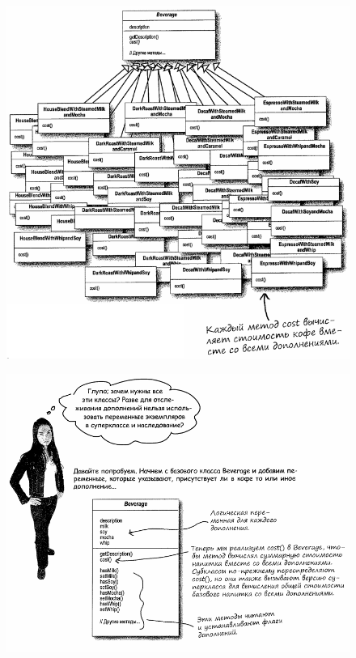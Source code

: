 \documentclass{beamer}
\begin{document}
\begin{frame}
\begin{figure}[h]
\centering
\includegraphics[scale=0.45]{images/lec10-pic04.png}
\label{pic-sort}
\end{figure}
\end{frame}

\begin{frame}
\begin{figure}[h]
\centering
\includegraphics[scale=0.5]{images/lec10-pic05.png}
\label{pic-sort}
\end{figure}
\end{frame}
\end{document}
